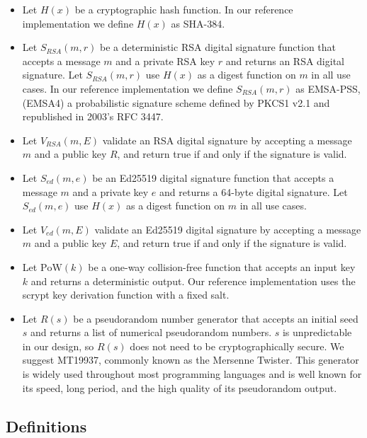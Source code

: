 \documentclass{sig-alternate}
\begin{document}
\begin{itemize}[noitemsep,nolistsep]
	\item Let $ H(x) $ be a cryptographic hash function. In our reference implementation we define $ H(x) $ as SHA-384.
	\item Let $ S_{\mathit{RSA}}(m, r) $ be a deterministic RSA digital signature function that accepts a message $ m $ and a private RSA key $ r $ and returns an RSA digital signature. Let $ S_{\mathit{RSA}}(m, r) $ use $ H(x) $ as a digest function on $ m $ in all use cases. In our reference implementation we define $ S_{\mathit{RSA}}(m, r) $ as EMSA-PSS, (EMSA4) a probabilistic signature scheme defined by PKCS1 v2.1 and republished in 2003's RFC 3447.
	\item Let $ V_{\mathit{RSA}}(m, E) $ validate an RSA digital signature by accepting a message $ m $ and a public key $ R $, and return true if and only if the signature is valid.
	\item Let $ S_{\mathit{ed}}(m, e) $ be an Ed25519 digital signature function that accepts a message $ m $ and a private key $ e $ and returns a 64-byte digital signature. Let $ S_{\mathit{ed}}(m, e) $ use $ H(x) $ as a digest function on $ m $ in all use cases.
	\item Let $ V_{\mathit{ed}}(m, E) $ validate an Ed25519 digital signature by accepting a message $ m $ and a public key $ E $, and return true if and only if the signature is valid.
	\item Let $ \mathrm{PoW}(k) $ be a one-way collision-free function that accepts an input key $ k $ and returns a deterministic output. Our reference implementation uses the scrypt\cite{percival2012scrypt} key derivation function with a fixed salt.
	\item Let $ \mathit{R}(s) $ be a pseudorandom number generator that accepts an initial seed $ s $ and returns a list of numerical pseudorandom numbers. $ s $ is unpredictable in our design, so $ \mathit{R}(s) $ does not need to be cryptographically secure. We suggest MT19937, commonly known as the Mersenne Twister. This generator is widely used throughout most programming languages and is well known for its speed, long period, and the high quality of its pseudorandom output.\cite{matsumoto1998mersenne}
\end{itemize}

\subsection{Definitions}
\end{document}
